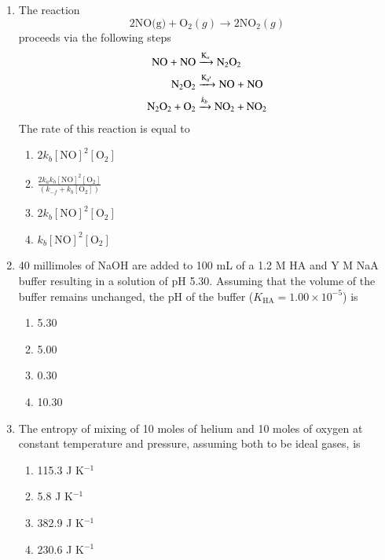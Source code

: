 \documentclass[journal,12pt,onecolumn]{IEEEtran}
\theoremstyle{remark}
\begin{document}
\begin{enumerate}
\item  The reaction \hfill{}
\[
\text{2NO(g)} + \text{O}_2(g) \rightarrow \text{2NO}_2(g)
\]
proceeds via the following steps \hfill{   }
\[
\begin{aligned}
\text{NO + NO} &\xrightarrow{\ce{K_a}} \text{N}_2\text{O}_2 \\
\text{N}_2\text{O}_2 &\xrightarrow{\ce{K_{a'}}} \text{NO + NO} \\
\text{N}_2\text{O}_2 + \text{O}_2 &\xrightarrow{k_b} \text{NO}_2 + \text{NO}_2
\end{aligned}
\]
The rate of this reaction is equal to \hfill{   }
\begin{multicols}{2}
\begin{enumerate} 
    \item $2k_b[\text{NO}]^2[\text{O}_2]$
    \item $\frac{2k_a k_b[\text{NO}]^2[\text{O}_2]}{(k_{-f}+k_b[\text{O}_2])}$
    \item $2k_b[\text{NO}]^2[\text{O}_2]$
    \item $k_b[\text{NO}]^2[\text{O}_2]$
\end{enumerate}
\end{multicols}

\item  40 millimoles of NaOH are added to 100 mL of a 1.2 M HA and Y M NaA buffer resulting in a solution of pH 5.30. Assuming that the volume of the buffer remains unchanged, the pH of the buffer ($K_\text{HA} = 1.00 \times 10^{-5}$) is\hfill{}
\begin{multicols}{4}
\begin{enumerate} 
    \item 5.30
    \item 5.00
    \item 0.30
    \item 10.30
\end{enumerate}
\end{multicols}

\item  The entropy of mixing of 10 moles of helium and 10 moles of oxygen at constant temperature and pressure, assuming both to be ideal gases, is\hfill{}
\begin{multicols}{2}
\begin{enumerate} 
    \item 115.3 J K$^{-1}$
    \item 5.8 J K$^{-1}$
    \item 382.9 J K$^{-1}$
    \item 230.6 J K$^{-1}$
\end{enumerate}
\end{multicols}


\end{enumerate}
\end{document}
